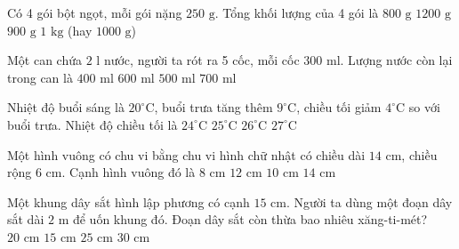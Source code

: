\begin{ex} %
Có 4 gói bột ngọt, mỗi gói nặng $250\text{ g}$. Tổng khối lượng của 4 gói là
\choice
{$800\text{ g}$}
{$1200\text{ g}$}
{$900\text{ g}$}
{\True $1\text{ kg}$ (hay $1000\text{ g}$)}
\end{ex}

\begin{ex} %
Một can chứa $2\text{ l}$ nước, người ta rót ra 5 cốc, mỗi cốc $300\text{ ml}$. Lượng nước còn lại trong can là
\choice
{$400\text{ ml}$}
{$600\text{ ml}$}
{\True $500\text{ ml}$}
{$700\text{ ml}$}
\end{ex}

\begin{ex} %
Nhiệt độ buổi sáng là $20^\circ\text{C}$, buổi trưa tăng thêm $9^\circ\text{C}$, chiều tối giảm $4^\circ\text{C}$ so với buổi trưa. Nhiệt độ chiều tối là
\choice
{$24^\circ\text{C}$}
{\True $25^\circ\text{C}$}
{$26^\circ\text{C}$}
{$27^\circ\text{C}$}
\end{ex}

\begin{ex} %
Một hình vuông có chu vi bằng chu vi hình chữ nhật có chiều dài $14\text{ cm}$, chiều rộng $6\text{ cm}$. Cạnh hình vuông đó là
\choice
{$8\text{ cm}$}
{$12\text{ cm}$}
{\True $10\text{ cm}$}
{$14\text{ cm}$}
\end{ex}

\begin{ex} %
Một khung dây sắt hình lập phương có cạnh $15\text{ cm}$. Người ta dùng một đoạn dây sắt dài $2\text{ m}$ để uốn khung đó. Đoạn dây sắt còn thừa bao nhiêu xăng-ti-mét?
\choice
{\True $20\text{ cm}$}
{$15\text{ cm}$}
{$25\text{ cm}$}
{$30\text{ cm}$}
\end{ex}

